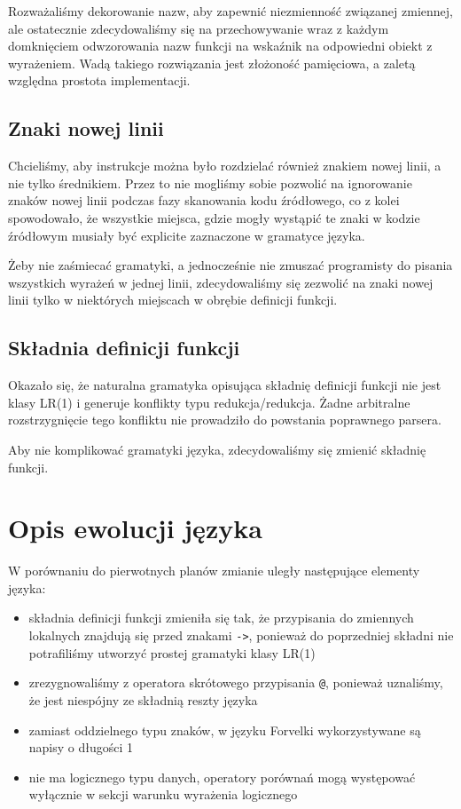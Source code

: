 \documentclass[4paper,10pt]{article}
\begin{document}
		Rozważaliśmy dekorowanie nazw, aby zapewnić niezmienność związanej zmiennej, ale ostatecznie zdecydowaliśmy się
		na przechowywanie wraz z każdym domknięciem odwzorowania nazw funkcji na wskaźnik na odpowiedni obiekt z wyrażeniem.
		Wadą takiego rozwiązania jest złożoność pamięciowa, a zaletą względna prostota implementacji.	
	
	\subsection{Znaki nowej linii}
		Chcieliśmy, aby instrukcje można było rozdzielać również znakiem nowej linii, a nie tylko średnikiem.
		Przez to nie mogliśmy sobie pozwolić na ignorowanie znaków nowej linii podczas fazy skanowania kodu źródłowego,
		co z kolei spowodowało, że wszystkie miejsca, gdzie mogły wystąpić te znaki w kodzie źródłowym
		musiały być explicite zaznaczone w gramatyce języka.

		Żeby nie zaśmiecać gramatyki, a jednocześnie nie zmuszać programisty do pisania wszystkich wyrażeń w jednej linii,
		zdecydowaliśmy się zezwolić na znaki nowej linii tylko w niektórych miejscach w obrębie definicji funkcji.
		
	
	\subsection{Składnia definicji funkcji}
		Okazało się, że naturalna gramatyka opisująca składnię definicji funkcji nie jest klasy LR(1)
		i generuje konflikty typu redukcja/redukcja.
		Żadne arbitralne rozstrzygnięcie tego konfliktu nie prowadziło do powstania poprawnego parsera.

		Aby nie komplikować gramatyki języka, zdecydowaliśmy się zmienić składnię funkcji.

\section{Opis ewolucji języka}
	W porównaniu do pierwotnych planów zmianie uległy następujące elementy języka:
	\begin{itemize}
		\item składnia definicji funkcji zmieniła się tak, że przypisania do zmiennych lokalnych znajdują się przed znakami \texttt{->}, ponieważ do poprzedniej składni nie potrafiliśmy utworzyć prostej gramatyki klasy LR(1)
		\item zrezygnowaliśmy z operatora skrótowego przypisania \texttt{@}, ponieważ uznaliśmy, że jest niespójny ze składnią reszty języka
		\item zamiast oddzielnego typu znaków, w języku Forvelki wykorzystywane są napisy o długości 1
		\item nie ma logicznego typu danych, operatory porównań mogą występować wyłącznie w sekcji warunku wyrażenia logicznego
	\end{itemize}
\end{document}
